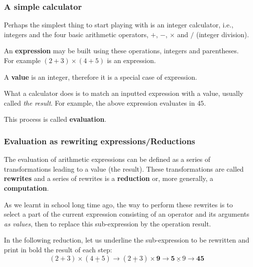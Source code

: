 
%
\begin{frame}
\frametitle{A simple calculator}

Perhaps the simplest thing to start playing with is an integer
calculator, i.e., integers and the four basic arithmetic operators,
\(+\), \(-\), \(\times\) and \(/\) (integer division).

\bigskip

An \textbf{expression} may be built using these operations, integers
and parentheses. For example \((2+3)\times(4+5)\) is an expression.

\bigskip

A \textbf{value} is an integer, therefore it is a special case of
expression.

\bigskip

What a calculator does is to match an inputted expression with a
value, usually called \emph{the result}. For example, the above
expression evaluates in \(45\).

\bigskip

This process is called \textbf{evaluation}.

\end{frame}

%
\begin{frame}
\frametitle{Evaluation as rewriting expressions/Reductions}

The evaluation of arithmetic expressions can be defined as a series of
transformations leading to a value (the result). These transformations
are called \textbf{rewrites} and a series of rewrites is a
\textbf{reduction} or, more generally, a \textbf{computation}.

\bigskip

As we learnt in school long time ago, the way to perform these
rewrites is to select a part of the current expression consisting of
an operator and its arguments \emph{as values}, then to replace this
sub-expression by the operation result.

\bigskip

In the following reduction, let us underline the sub-expression to be
rewritten and print in bold the result of each step:
\[
(2+3) \times (\underline{4+5}) \rightarrow (\underline{2+3}) \times
\textbf{9} \rightarrow \underline{\textbf{5} \times 9}
\rightarrow \textbf{45}
\]

\end{frame}

